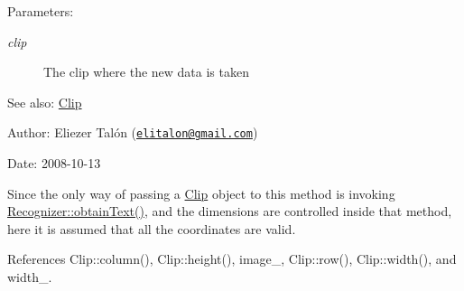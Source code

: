 \begin{Desc}
\item[Parameters:]
\begin{description}
\item[{\em clip}]The clip where the new data is taken\end{description}
\end{Desc}
\begin{Desc}
\item[See also:]\hyperlink{class_clip}{Clip}\end{Desc}
\begin{Desc}
\item[Author:]Eliezer Talón (\href{mailto:elitalon@gmail.com}{\tt elitalon@gmail.com}) \end{Desc}
\begin{Desc}
\item[Date:]2008-10-13\end{Desc}
Since the only way of passing a \hyperlink{class_clip}{Clip} object to this method is invoking \hyperlink{class_recognizer_008a0ea69a912ff54882dd20d18adcf9}{Recognizer::obtainText()}, and the dimensions are controlled inside that method, here it is assumed that all the coordinates are valid. 

References Clip::column(), Clip::height(), image\_\-, Clip::row(), Clip::width(), and width\_\-.